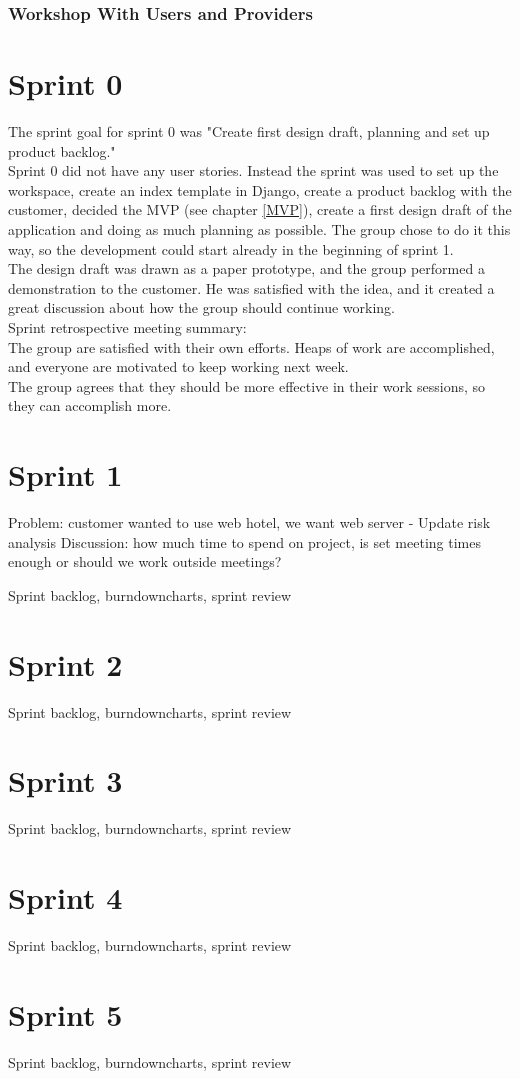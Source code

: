 \subsubsection{Workshop With Users and Providers}

\section{Sprint 0}
The sprint goal for sprint 0 was "Create first design draft, planning and set up product backlog." \\

Sprint 0 did not have any user stories. Instead the sprint was used to set up the workspace, create an index template in Django, create a product backlog with the customer, decided the MVP (see chapter \ref{MVP}), create a first design draft of the application and doing as much planning as possible. The group chose to do it this way, so the development could start already in the beginning of sprint 1. \\

The design draft was drawn as a paper prototype, and the group performed a demonstration to the customer. He was satisfied with the idea, and it created a great discussion about how the group should continue working. \\

Sprint retrospective meeting summary:\\
The group are satisfied with their own efforts. Heaps of work are accomplished, and everyone are motivated to keep working next week. \\
    
The group agrees that they should be more effective in their work sessions, so they can accomplish more. 


\section{Sprint 1}
Problem: customer wanted to use web hotel, we want web server
- Update risk analysis
Discussion: how much time to spend on project, is set meeting times enough or should we work outside meetings?

Sprint backlog, burndowncharts, sprint review

\section{Sprint 2}
Sprint backlog, burndowncharts, sprint review

\section{Sprint 3}
Sprint backlog, burndowncharts, sprint review

\section{Sprint 4}
Sprint backlog, burndowncharts, sprint review

\section{Sprint 5}
Sprint backlog, burndowncharts, sprint review

\cleardoublepage